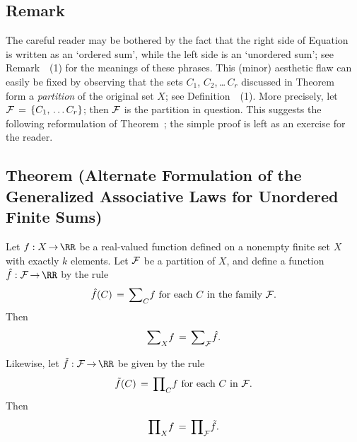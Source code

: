             \subsection{\small{\bf Remark}}
            \label{RemrkB10.80}

        The careful reader may be bothered by the fact that the right side of Equation~ is written as an `ordered sum', while the left side is an `unordered sum';
    see Remark~~(1) for the meanings of these  phrases.
    This (minor) aesthetic flaw can easily be fixed by observing that the sets $C_{1}$, $C_{2}$,\,{\ldots}\,$C_{r}$ discussed in Theorem~
    form a {\em partition} of the original set $X$; see Definition~~(1).
    More precisely, let ${\cal F} \,=\, \{C_{1},\,{\ldots}\,C_{r}\}$; then ${\cal F}$ is the partition in question.
    This suggests the following reformulation of Theorem~; the simple proof is left as an exercise for the reader.

\V

            \subsection{\small{\bf Theorem} (Alternate Formulation of the Generalized Associative Laws for Unordered Finite Sums)}
            \label{ThmB10.90}

        Let $f:X \,{\rightarrow}\, {\RR}$ be a real-valued function defined on a nonempty finite set $X$ with exactly $k$ elements.
    Let ${\cal F}$ be a partition of $X$, and define a function $\hat{f}:{\cal F} \,{\rightarrow}\, {\RR}$ by the rule
        \begin{displaymath}
        \hat{f}(C) \,=\, {\sum}_{C} f \mbox{ for each $C$ in the family ${\cal F}$}.
        \end{displaymath}
    Then
        \begin{equation}
        \label{EqnB.30A}
        {\sum}_{X} f \,=\, {\sum}_{{\cal F}} \hat{f}.
        \end{equation}

        Likewise, let $\tilde{f}:{\cal F} \,{\rightarrow}\, {\RR}$ be given by the rule
        \begin{displaymath}
        \tilde{f}(C) \,=\, {\prod}_{C} f \mbox{ for each $C$ in ${\cal F}$}.
        \end{displaymath}
    Then
        \begin{equation}
        \label{EqnB.30B}
        {\prod}_{X} f \,=\, {\prod}_{{\cal F}} \tilde{f}.
        \end{equation}

